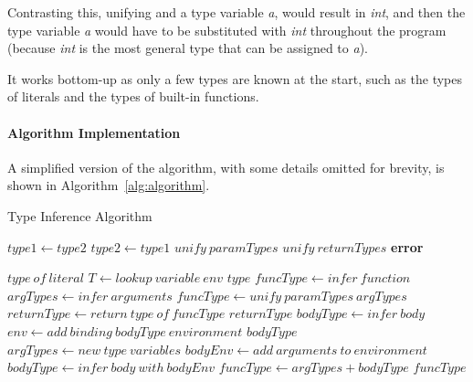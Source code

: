Contrasting this, unifying  and a type variable \textit{a}, would result in \textit{int}, and then the type
variable \textit{a} would have to be substituted with \textit{int} throughout the program (because \textit{int} is the
most general type that can be assigned to \textit{a}).

It works bottom-up as only a few types are known at the start, such as the types of literals and the types of
built-in functions.

\paragraph{Algorithm Implementation}\label{par:algorithm-implementation}
A simplified version of the algorithm, with some details omitted for brevity, is shown in Algorithm~\ref{alg:algorithm}.

\begin{algorithm}
    \caption{Type Inference Algorithm}
    \begin{algorithmic}[1]
                \State $type1 \gets type2$
            \EndIf
                \State $type2 \gets type1$
            \EndIf
                \State $unify\ paramTypes$
                \State $unify\ returnTypes$
            \EndIf
                \State \textbf{error}
            \EndIf
        \EndFunction

                \State \Return $type\ of\ literal$
            \EndIf
                \State $T \gets lookup\ variable\ env$
                \State \Return $type$
            \EndIf
                \State $funcType \gets infer\ function$
                \State $argTypes \gets infer\ arguments$
                \State $funcType \gets unify\ paramTypes\ argTypes$
                \State $returnType \gets return\ type\ of\ funcType$
                \State \Return $returnType$
            \EndIf
                \State $bodyType \gets infer\ body$
                \State $env \gets add\ binding\ bodyType\ environment$
                \State \Return $bodyType$
            \EndIf
                \State $argTypes \gets new\ type\ variables$
                \State $bodyEnv \gets add\ arguments\ to\ environment$
                \State $bodyType \gets infer\ body\ with\ bodyEnv$
                \State $funcType \gets argTypes+bodyType$
                \State \Return $funcType$
            \EndIf
        \EndFunction
    \end{algorithmic}\label{alg:algorithm}
\end{algorithm}

